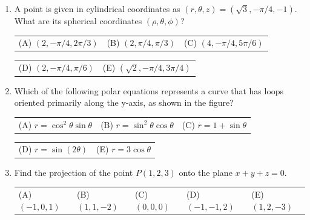 \documentclass[a4paper, 12pt]{article}
\begin{document}
\begin{enumerate}[leftmargin=*,label=\textbf{\arabic*.}]

\item A point is given in cylindrical coordinates as $(r,\theta,z)=\left(\sqrt{3},-\pi/4,-1\right)$. What are its spherical coordinates $(\rho, \theta, \phi)$?

\begin{center}
\begin{tabular}{lll}
(A) $(2, -\pi/4, 2\pi/3)$ &
(B) $(2, \pi/4, \pi/3)$ &
(C) $(4, -\pi/4, 5\pi/6)$
\end{tabular}

\begin{tabular}{ll}
(D) $(2, -\pi/4, \pi/6)$ &
(E) $(\sqrt2, -\pi/4, 3\pi/4)$
\end{tabular}
\end{center}

\item \leavevmode
\vspace{-1.2em}

\begin{minipage}[b]{0.66\textwidth}
Which of the following polar equations represents a curve that has loops oriented primarily along the y-axis, as shown in the figure?

\begin{center}
\begin{tabular}{lll}
(A) $r = \cos^2\theta \sin\theta$ &
(B) $r = \sin^2\theta \cos\theta$ &
(C) $r = 1 + \sin\theta$
\end{tabular}

\begin{tabular}{ll}
(D) $r = \sin(2\theta)$ &
(E) $r = 3\cos\theta$
\end{tabular}
\end{center}
\end{minipage}
\hfill
\begin{minipage}[t]{0.25\textwidth}
\centering
{}
\end{minipage}

\item Find the projection of the point $P(1,2,3)$ onto the plane $x+y+z=0$.
\begin{center}
\begin{tabular}{lllll}
(A) $(-1,0,1)$ &
(B) $(1,1,-2)$ &
(C) $(0,0,0)$ &
(D) $(-1,-1,2)$ &
(E) $(1,2,-3)$
\end{tabular}
\end{center}


\end{enumerate}
\end{document}
